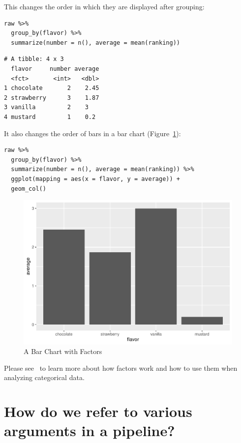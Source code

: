 This changes the order in which they are displayed after grouping:

\begin{lstlisting}
raw %>%
  group_by(flavor) %>%
  summarize(number = n(), average = mean(ranking))
\end{lstlisting}

\begin{lstlisting}
# A tibble: 4 x 3
  flavor     number average
  <fct>       <int>   <dbl>
1 chocolate       2    2.45
2 strawberry      3    1.87
3 vanilla         2    3   
4 mustard         1    0.2 
\end{lstlisting}

\noindent
It also changes the order of bars in a bar chart (Figure~\ref{fig:simple-bar-chart}):

\begin{lstlisting}
raw %>%
  group_by(flavor) %>%
  summarize(number = n(), average = mean(ranking)) %>%
  ggplot(mapping = aes(x = flavor, y = average)) +
  geom_col()
\end{lstlisting}

\begin{figure}[h]
  \includegraphics{figures/debt/simple-bar-chart-1.pdf}
  \caption{A Bar Chart with Factors}
  \label{fig:simple-bar-chart}
\end{figure}

Please see~\cite{McNa2017}
to learn more about how factors work and how to use them when analyzing categorical data.

\section{How do we refer to various arguments in a pipeline?}

